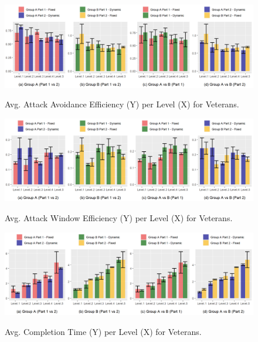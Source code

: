 \begin{figure}[!ht]
    \begin{center}
        \caption{Avg. Attack Avoidance Efficiency (Y) per Level (X) for Veterans.}
        \includegraphics[width=34em]{figures/attack_avoidance_efficiency-veteran_players.png}
    \label{fig:result-metric-veterans-attack-avoidance-efficiency}
    \end{center}
\end{figure}

\begin{figure}[!ht]
    \begin{center}
    \caption{Avg. Attack Window Efficiency (Y) per Level (X) for Veterans.}
        \includegraphics[width=34em]{figures/attack_window_efficiency-veteran_players.png}
    \label{fig:result-metric-veterans-attack-window-efficiency}
    \end{center}
\end{figure}

\begin{figure}[!ht]
    \begin{center}
    \caption{Avg. Completion Time (Y) per Level (X) for Veterans.}
        \includegraphics[width=34em]{figures/completion_time-veteran_players.png}
        \label{fig:result-metric-veterans-completion-time}
    \end{center}
\end{figure}

